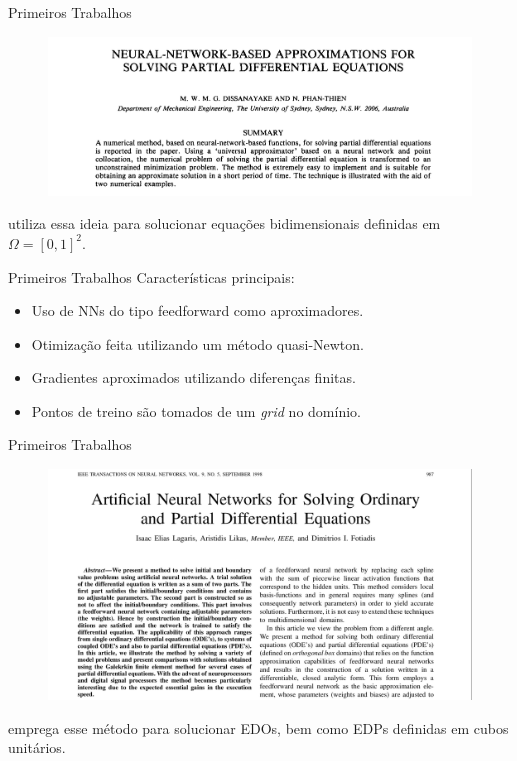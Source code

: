 \documentclass[13pt]{beamer}
\begin{document}
\begin{frame}{Primeiros Trabalhos}
    \begin{figure}[htb]
        \includegraphics[width=\textwidth]{../figuras/seminal-1994.png}
    \end{figure}
    \cite{dissanayake94} utiliza essa ideia para solucionar equações bidimensionais definidas em \( \Omega = [0, 1]^2 \).
\end{frame}


\begin{frame}{Primeiros Trabalhos}
    Características principais:
    \begin{itemize}
        \item<1-> Uso de NNs do tipo feedforward como aproximadores.
        \item<2-> Otimização feita utilizando um método quasi-Newton.
        \item<3-> Gradientes aproximados utilizando diferenças finitas.
        \item<4-> Pontos de treino são tomados de um \emph{grid} no domínio.
    \end{itemize}
\end{frame}

\begin{frame}{Primeiros Trabalhos}
    \begin{figure}[htb]
        \includegraphics[width=.8\textwidth]{../figuras/seminal-1998.png}
    \end{figure}
    \cite{lagaris98} emprega esse método para solucionar EDOs, bem como EDPs definidas em cubos unitários.
\end{frame}
\end{document}
